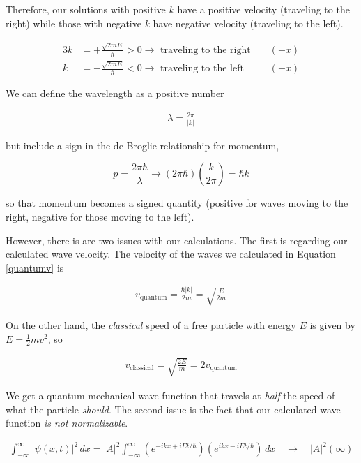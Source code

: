 Therefore, our solutions with positive $k$ have a positive velocity (traveling
to the right) while those with negative $k$ have negative velocity (traveling
to the left). 

\begin{alignat*}{3}
  k &= +\frac{\sqrt{2mE}}{\hbar} > 0 \rightarrow \text{ traveling to the right }&& (+x)  
    \\ k &= -\frac{\sqrt{2mE}}{\hbar} < 0 \rightarrow \text{ traveling to the left } && (-x)
  \end{alignat*}

We can define the wavelength as a positive number 

\begin{align} \label{wavelengthk}
  \lambda = \frac{2\pi}{|k|}
\end{align}\vspace{3px}

but include a sign in the de Broglie relationship for momentum, 

\[
 p = \frac{2\pi\hbar}{\lambda}\rightarrow (2\pi\hbar) \left( \frac{k}{2\pi}
 \right) = \hbar k 
\] \vspace{3px}

so that momentum becomes a signed quantity (positive for waves moving to the
right, negative for those moving to the left). 

However, there is are two issues with our calculations. The first is regarding
our calculated wave velocity. The velocity of the
waves we calculated in Equation \ref{quantumv} is 

\begin{align} \label{}
  v_\text{quantum} = \frac{\hbar |k|}{2m} = \sqrt{\frac{E}{2m}}
\end{align}\vspace{3px}


On the other hand, the \textit{classical} speed of a free particle with energy
$E$ is given by $E = \frac{1}{2}mv^2$, so 

\begin{align} \label{}
  v_\text{classical} = \sqrt{\frac{2E}{m}} = 2v_\text{quantum} 
\end{align}\vspace{3px}

We get a quantum mechanical wave function that travels at \textit{half} the
speed of what the particle \textit{should}. The second issue is the fact that
our calculated wave function \textit{is not normalizable}. 

\begin{align} \label{}
  \int_{-\infty}^{\infty}  |\psi(x, t)|^2 \, dx = |A|^2 \int_{-\infty}^{\infty}
   \left( e^{-ikx + iEt/\hbar} \right) \left(
  e^{ikx - iEt/\hbar} \right)  \, dx \quad \rightarrow \quad |A|^2 (\infty)   
\end{align}\vspace{3px}


